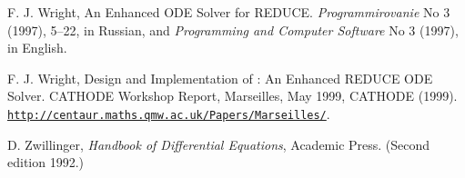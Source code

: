 \begin{thebibliography}{99}
 F. J. Wright, An Enhanced ODE Solver for REDUCE.
\textit{Programmirovanie} No 3 (1997), 5--22, in Russian, and
\textit{Programming and Computer Software} No 3 (1997), in English.

 F. J. Wright, Design and Implementation of
 : An Enhanced REDUCE ODE Solver.  CATHODE Workshop
Report, Marseilles, May 1999, CATHODE (1999). \\
\href{http://centaur.maths.qmw.ac.uk/Papers/Marseilles/}%
{\texttt{http://centaur.maths.qmw.ac.uk/Papers/Marseilles/}}.

 D. Zwillinger, \textit{Handbook of Differential
Equations}, Academic Press.  (Second edition 1992.)

\end{thebibliography}

